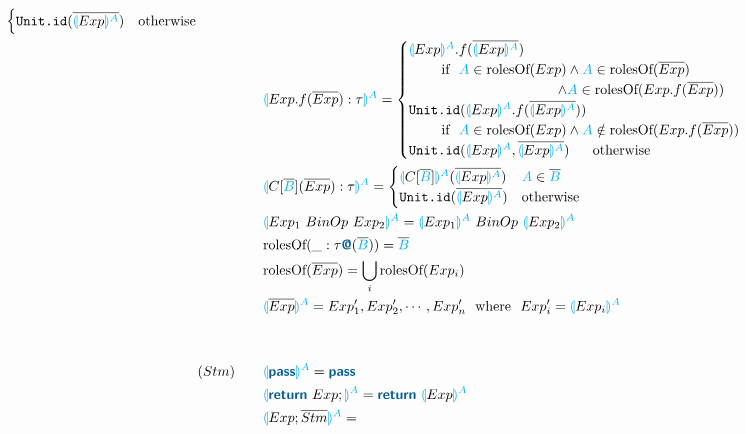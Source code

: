 \documentclass{thesis}
\newcommand{\projection}[2]{{\color{cyan}\llparenthesis}#1{\color{cyan}\rrparenthesis^#2}}
\newcommand{\mblue}[1]{\textbf{\textsf{\color{MidnightBlue}#1}}}
\begin{document}
\begin{alignat*}{2}
\begin{cases}
    \texttt{Unit.id}(\overline{\projection{Exp}{A}}) &\text{otherwise}
  \end{cases}\\
  &&&\projection{Exp.f(\overline{Exp}):\tau}{A}=
  \begin{cases}
    \projection{Exp}{A}.f(\overline{\projection{Exp}{A}}) \\
    ~~~~~~~\text{if}~~ {\color{cyan}A} \in \text{rolesOf}(Exp) \wedge {\color{cyan}A} \in \text{rolesOf}(\overline{Exp})\\
    ~~~~~~~~~~~~~~~~~~~~~~~~~~~~~~~~ \wedge {\color{cyan}A} \in \text{rolesOf}(Exp.f(\overline{Exp}))\\
    \texttt{Unit.id}(\projection{Exp}{A}.f(\overline{\projection{Exp}{A}})) \\
    ~~~~~~~\text{if}~~ {\color{cyan}A} \in \text{rolesOf}(Exp) \wedge {\color{cyan}A} \notin \text{rolesOf}(Exp.f(\overline{Exp}))\\
    \texttt{Unit.id}(\projection{Exp}{A},\overline{\projection{Exp}{A}}) ~~~~~\text{otherwise}
  \end{cases}\\
  &&&\projection{C[\overline{\color{cyan}B}](\overline{Exp}):\tau}{A}=
  \begin{cases}
    \projection{C[\overline{\color{cyan}B}]}{A} (\overline{\projection{Exp}{A}}) & {\color{cyan}A} \in \overline{\color{cyan}B}\\
    \texttt{Unit.id}(\overline{\projection{Exp}{A}}) &\text{otherwise}
  \end{cases}\\
  &&&\projection{Exp_1 ~BinOp~ Exp_2}{A} = \projection{Exp_1}{A} ~BinOp~ \projection{Exp_2}{A}\\
  &&&\text{rolesOf}(\_:\tau\mblue{@}(\overline{\color{cyan}B})) = {\overline{\color{cyan}B}}\\
  &&&\text{rolesOf}(\overline{Exp}) = \bigcup_i \text{rolesOf}(Exp_i) \\
  &&&\projection{\overline{Exp}}{A} = Exp'_1,Exp'_2,\cdots,Exp'_n ~~\text{where}~~ Exp'_i = \projection{Exp_i}{A}\\ 
  \\
  \\ 
  &(Stm)~~~ &&\projection{\mblue{pass}}{A} = \mblue{pass}\\
  &&&\projection{\mblue{return} ~ Exp;}{A} = \mblue{return} ~ \projection{Exp}{A}\\
  &&&\projection{Exp;\overline{Stm}}{A} =

\end{alignat*}
\end{document}
